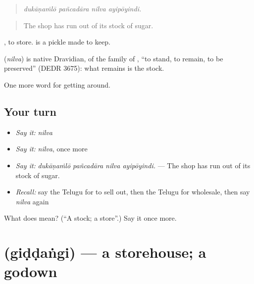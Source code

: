 \begin{quote}
\emph{dukāṇaṁlō pañcadāra nilva ayipōyindi.}
\end{quote}

\begin{quote}
The shop has run out of its stock of sugar.
\end{quote}

 , to store.   is a pickle made to keep.

\begin{cousinweb}
\textbf{} (\emph{nilva}) is native Dravidian, of the family of , \textquotedblleft{}to stand, to remain, to be preserved\textquotedblright{} (DEDR 3675): what remains is the stock.
\end{cousinweb}

\begin{grammarlens}[title={What you've built}]
One more word for getting around.
\end{grammarlens}

\subsection*{Your turn}
\begin{itemize}
\raggedright
  \item \emph{Say it:} \emph{nilva}
  \item \emph{Say it:} \emph{nilva}, once more
  \item \emph{Say it:} \emph{dukāṇaṁlō pañcadāra nilva ayipōyindi.} — The shop has run out of its stock of sugar.
  \item \emph{Recall:} say the Telugu for to sell out, then the Telugu for wholesale, then say \emph{nilva} again
\end{itemize}

\begin{tcolorbox}[breakable,colback=teal!4,colframe=teal!35!black,title={Before you move on}]
What does  mean? (\textquotedblleft{}A stock; a store\textquotedblright{}.) Say it once more.
\end{tcolorbox}
\section[\texorpdfstring{\te{గిడ్డంగి} (giḍḍaṅgi)}{గిడ్డంగి (giḍḍaṅgi)}]{ (giḍḍaṅgi) — a storehouse; a godown}

\label{lesson:TE-C488-giddangi}



